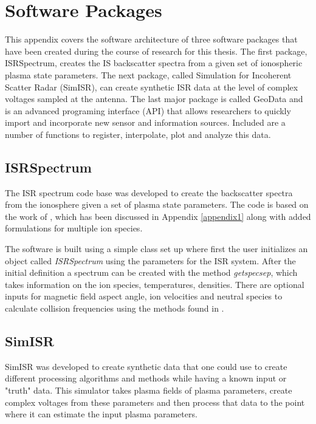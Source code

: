 \chapter{Software Packages}
\label{chapter:appsoft}
\thispagestyle{myheadings}

\graphicspath{{Appendix/Figures/}}


This appendix covers the software architecture of three software packages that have been created during the course of research for this thesis. The first package, ISRSpectrum, creates the IS backscatter spectra from a given set of ionospheric plasma state parameters. The next package, called Simulation for Incoherent Scatter Radar (SimISR), can create synthetic ISR data at the level of complex voltages sampled at the antenna. The last major package is called GeoData and is an advanced programing interface (API) that allows researchers to quickly import and incorporate new sensor and information sources. Included are a number of functions to register, interpolate, plot and analyze this data.

\section{ISRSpectrum}
The ISR spectrum code base was developed to create the backscatter spectra from the ionosphere given a set of plasma state parameters. The code is based on the work of \citet{kudeki:milla:1}, which has been discussed in Appendix \ref{appendix1} along with added formulations for multiple ion species.

The software is built using a simple class set up where first the user initializes an object called \textit{ISRSpectrum} using the parameters for the ISR system. After the initial definition a spectrum can be created with the method \textit{getspecsep}, which takes information on the ion species, temperatures, densities. There are optional inputs for magnetic field aspect angle, ion velocities and neutral species to calculate collision frequencies using the methods found in \citet{schunk2004ionospheres}.

\section{SimISR}

SimISR was developed to create synthetic data that one could use to create different processing algorithms and methods while having a known input or "truth" data. This simulator takes plasma fields of plasma parameters, create complex voltages from these parameters and then process that data to the point where it can estimate the input plasma parameters.

